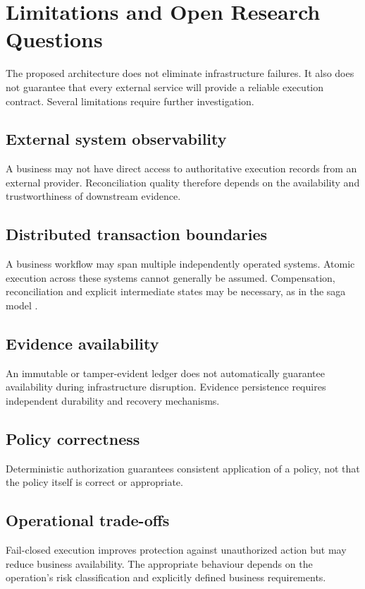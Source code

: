 \documentclass[11pt,a4paper]{article}
\begin{document}
\section{Limitations and Open Research Questions}

The proposed architecture does not eliminate infrastructure failures. It also does not guarantee that every external service will provide a reliable execution contract. Several limitations require further investigation.

\subsection{External system observability}
A business may not have direct access to authoritative execution records from an external provider. Reconciliation quality therefore depends on the availability and trustworthiness of downstream evidence.

\subsection{Distributed transaction boundaries}
A business workflow may span multiple independently operated systems. Atomic execution across these systems cannot generally be assumed. Compensation, reconciliation and explicit intermediate states may be necessary, as in the saga model \cite{sagas}.

\subsection{Evidence availability}
An immutable or tamper-evident ledger does not automatically guarantee availability during infrastructure disruption. Evidence persistence requires independent durability and recovery mechanisms.

\subsection{Policy correctness}
Deterministic authorization guarantees consistent application of a policy, not that the policy itself is correct or appropriate.

\subsection{Operational trade-offs}
Fail-closed execution improves protection against unauthorized action but may reduce business availability. The appropriate behaviour depends on the operation's risk classification and explicitly defined business requirements.
\end{document}
